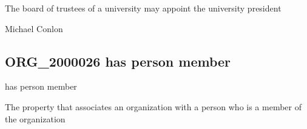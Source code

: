 \documentclass[letterpaper,10pt,english]{sphinxmanual}
\begin{document}
\begin{sphinxShadowBox}

\sphinxAtStartPar
{\hyperref[\detokenize{doc-ORG_0000001::doc}]{}}
\end{sphinxShadowBox}

\begin{sphinxShadowBox}

\sphinxAtStartPar
The board of trustees of a university may appoint the university president
\end{sphinxShadowBox}

\begin{sphinxShadowBox}

\sphinxAtStartPar
Michael Conlon 
\end{sphinxShadowBox}
\begin{quote}

\ignorespaces \end{quote}


\subsection{ORG\_2000026 \sphinxhyphen{} has person member}
\label{\detokenize{doc-ORG_2000026:org-2000026-has-person-member}}\label{\detokenize{doc-ORG_2000026:index-0}}\label{\detokenize{doc-ORG_2000026::doc}}
\begin{sphinxShadowBox}

\sphinxAtStartPar
has person member
\end{sphinxShadowBox}

\begin{sphinxShadowBox}

\sphinxAtStartPar
{}
\end{sphinxShadowBox}

\begin{sphinxShadowBox}

\sphinxAtStartPar
The property that associates an organization with a person who is  a member of the organization
\end{sphinxShadowBox}
\end{document}
